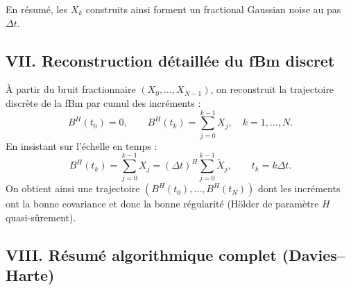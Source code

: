 \documentclass[11pt,a4paper]{article}
\newcommand{\1}{\mathbf{1}}
\newcommand{\bH}{B^{H}}
\begin{document}
En résumé, les $X_k$ construits ainsi forment un fractional
Gaussian noise au pas $\Delta t$.

\subsection*{VII. Reconstruction détaillée du fBm discret}

À partir du bruit fractionnaire $(X_0,\dots,X_{N-1})$, on reconstruit
la trajectoire discrète de la fBm par cumul des incréments :
\begin{equation}
  \bH(t_0) = 0,
  \qquad
  \bH(t_k) = \sum_{j=0}^{k-1} X_j,
  \quad k=1,\dots,N.
\end{equation}
En insistant sur l'échelle en temps :
\begin{equation}
  \bH(t_k)
  = \sum_{j=0}^{k-1} X_j
  = (\Delta t)^H \sum_{j=0}^{k-1} \tilde{X}_j,
  \qquad t_k = k\Delta t.
\end{equation}
On obtient ainsi une trajectoire
$(\bH(t_0),\dots,\bH(t_N))$ dont les incréments ont la bonne
covariance et donc la bonne régularité (Hölder de paramètre $H$
quasi-sûrement).

\subsection*{VIII. Résumé algorithmique complet (Davies--Harte)}
\end{document}
